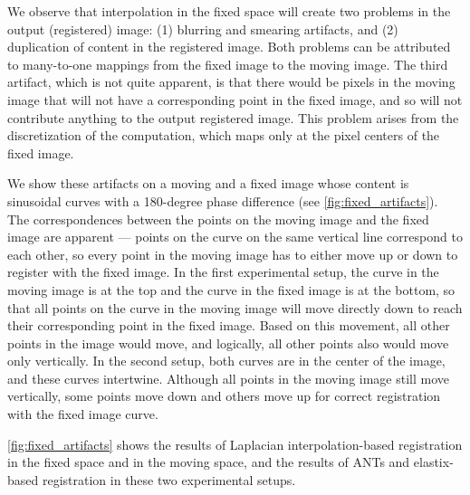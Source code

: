 \documentclass[lettersize,journal]{IEEEtran}
\begin{document}
We observe that interpolation in the fixed space will create two problems in the output (registered) image: (1) blurring and smearing artifacts, and (2) duplication of content in the registered image. Both problems can be attributed to many-to-one mappings from the fixed image to the moving image. The third artifact, which is not quite apparent, is that there would be pixels in the moving image that will not have a corresponding point in the fixed image, and so will not contribute anything to the output registered image. This problem arises from the discretization of the computation, which maps only at the pixel centers of the fixed image.

We show these artifacts on a moving and a fixed image whose content is sinusoidal curves with a 180-degree phase difference (see \autoref{fig:fixed_artifacts}). The correspondences between the points on the moving image and the fixed image are apparent — points on the curve on the same vertical line correspond to each other, so every point in the moving image has to either move up or down to register with the fixed image. In the first experimental setup, the curve in the moving image is at the top and the curve in the fixed image is at the bottom, so that all points on the curve in the moving image will move directly down to reach their corresponding point in the fixed image. Based on this movement, all other points in the image would move, and logically, all other points also would move only vertically. In the second setup, both curves are in the center of the image, and these curves intertwine. Although all points in the moving image still move vertically, some points move down and others move up for correct registration with the fixed image curve.

\autoref{fig:fixed_artifacts} shows the results of Laplacian interpolation-based registration in the fixed space and in the moving space, and the results of ANTs and elastix-based registration in these two experimental setups. 
\end{document}
